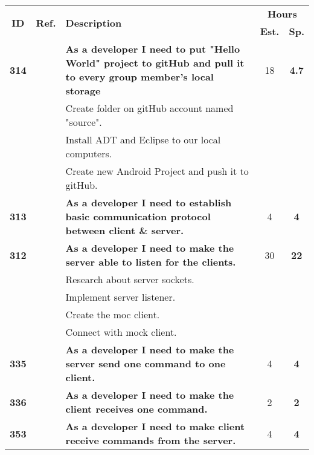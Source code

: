   \label{tab:sprint1stories}
 \def\arraystretch{1.25}
 
\begin{longtable}{ccXcc}

\toprule[1mm]
\multirow{2}{*}{\textbf{ID}} &
\multirow{2}{*}{\textbf{Ref.}} & \multirow{2}{*}{\textbf{Description}} & \multicolumn{2}{c}{\textbf{Hours}} \\
 					& & & \textbf{Est.} & \textbf{Sp.} \\
\midrule
\textbf{314} 	& {M6}
	& {\bf As a developer I need to put "Hello World" project to gitHub and pull it to every group member's local storage} 	& 	18	& \textbf{ 4.7} \\
				&& Create folder on gitHub account named "source".	&  &  \\
				&& Install ADT and Eclipse to our local computers. 	&  &  \\
				&& Create new Android Project and push it to gitHub. 	&  &  \\


\textbf{313} 	& {C1}
	& {\bf As a developer I need to establish basic communication protocol between client \& server.} 	& 		4	& \textbf{4} \\
	
\textbf{312} 	& {C1}
	& {\bf As a developer I need to make the server able to listen for the clients.} 	& 	30	& \textbf{22} \\
				&& Research about server sockets.	&  &  \\
				&& Implement server listener.	&  &  \\
				&& Create the moc client. &  &  \\
				&& Connect with mock client. &  &  \\
	
\textbf{335} 	& {M6}
	& {\bf As a developer I need to make the server send one command to one client. } 	& 		4	& \textbf{4} \\

\textbf{336} 	& {M6}
	& {\bf As a developer I need to make the client receives one command. } 	& 	2	& \textbf{2} \\

\textbf{353} 	& {M6}
	& {\bf As a developer I need to make client receive commands from the server.} 	& 	4		& \textbf{4} \\


\end{longtable}
